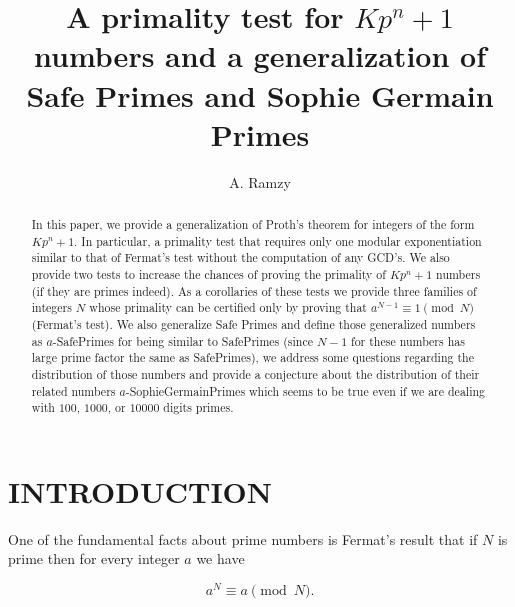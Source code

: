 \documentclass{amsart}
\title[A primality test for $Kp^n+1$ numbers]{A primality test for $Kp^n+1$ numbers and a generalization of Safe Primes and Sophie Germain Primes}
\date{}
\author{A. Ramzy}
\numberwithin{equation}{section}
\begin{document}
\begin{abstract}
In this paper, we provide a generalization of Proth's theorem for integers of the form $Kp^n+1$. In particular, a primality test that requires only one modular exponentiation similar to that of Fermat's test without the computation of any GCD's. We also provide two tests to increase the chances of proving the primality of $Kp^n+1$ numbers (if they are primes indeed). As a corollaries of these tests we provide three families of integers $N$ whose primality can be certified only by proving that $a^{N-1} \equiv 1 \pmod N$ (Fermat's test). We also generalize Safe Primes and define those generalized numbers as $a$-SafePrimes for being similar to SafePrimes (since $N-1$ for these numbers has large prime factor the same as SafePrimes), we address some questions regarding the distribution of those numbers and provide a conjecture about the distribution of their related numbers $a$-SophieGermainPrimes which seems to be true even if we are dealing with $100$, $1000$, or $10000$ digits primes.
\end{abstract}
\maketitle


\section{INTRODUCTION}

One of the fundamental facts about prime numbers is Fermat's result that if $N$ is prime then for every integer $a$ we have

\begin{equation}
	\label{fer1}
	a^N \equiv a \pmod N.
\end{equation}
\end{document}
